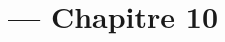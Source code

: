 
\title{\TSwiftTitle{} --- Chapitre 10}

\newcommand{\TSwiftRoot}[0]{../..} %



\maketitle

\tableofcontents




